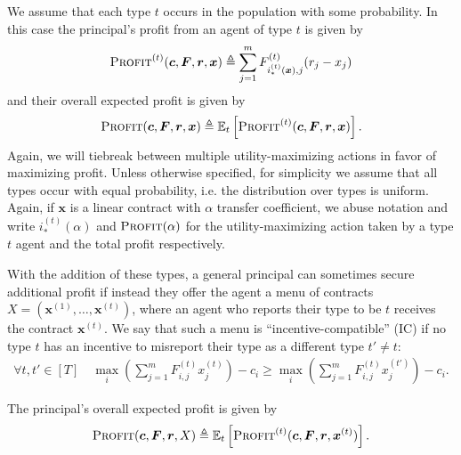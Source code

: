 \documentclass{article}
\newcommand{\E}{\mathbb{E}}
\newcommand{\CostVector}{\bm{c}}
\newcommand{\TypedForecast}[3]{F^{(#1)}_{#2, #3}}
\newcommand{\ForecastTensor}{\bm{F}}
\newcommand{\reward}[1]{r_{#1}}
\newcommand{\RewardVector}{\bm{r}}
\newcommand{\TypedContract}[2]{x^{(#1)}_{#2}}
\newcommand{\ContractVector}{\bm{x}}
\newcommand{\TypedContractVector}[1]{\bm{x}^{(#1)}}
\newcommand{\ContractMatrix}{X}
\newcommand{\TransferCoefficient}{\alpha}
\newcommand{\OptimalAction}{i_*}
\newcommand{\TypedOptimalAction}[1]{\OptimalAction^{(#1)}}
\newcommand{\Profit}{\textsc{Profit}}
\newcommand{\TypedProfit}[1]{\Profit^{(#1)}}
\newcommand{\contract}[1]{x_{#1}}
\begin{document}
We assume that each type $t$ occurs in the population with some probability. In this case the principal's profit from an agent of type $t$ is given by
\begin{align*}
  \TypedProfit{t}(\CostVector, \ForecastTensor, \RewardVector, \ContractVector)
    \triangleq \sum_{j=1}^m \TypedForecast{t}{\TypedOptimalAction{t}(\ContractVector)}{j} (\reward{j} - \contract{j})
\end{align*}
and their overall expected profit is given by 
\begin{align*}
  \Profit(\CostVector, \ForecastTensor, \RewardVector, \ContractVector)
    \triangleq \E_t \left[ \TypedProfit{t}(\CostVector, \ForecastTensor, \RewardVector, \ContractVector) \right] \text{.}
\end{align*}
Again, we will tiebreak between multiple utility-maximizing actions in favor of maximizing profit. Unless otherwise specified, for simplicity  we assume that all types occur with equal probability, i.e. the distribution over types is uniform. Again, if $\ContractVector$ is a linear contract with $\TransferCoefficient$ transfer coefficient, we abuse notation and write $\TypedOptimalAction{t}(\TransferCoefficient)$ and $\Profit(\TransferCoefficient)$ for the utility-maximizing action taken by a type $t$ agent and the total profit respectively.

With the addition of these types, a general principal can sometimes secure additional profit if instead they offer the agent a menu of contracts $\ContractMatrix = \left(\TypedContractVector{1}, \ldots, \TypedContractVector{t}\right)$, where an agent who reports their type to be $t$ receives the contract $\TypedContractVector{t}$. We say that such a menu is ``incentive-compatible'' (IC) if no type $t$ has an incentive to misreport their type as a different type $t' \ne t$:
\begin{align}
  \label{ineq:ic}
  \forall t, t' \in [T] \quad \max_i \left( \sum_{j=1}^m \TypedForecast{t}{i}{j} \TypedContract{t}{j} \right) - c_i
                          \ge \max_i \left( \sum_{j=1}^m \TypedForecast{t}{i}{j} \TypedContract{t'}{j} \right) - c_i
  \text{.}
  \tag{IC}
\end{align}

The principal's overall expected profit is given by
\begin{align*}
  \Profit(\CostVector, \ForecastTensor, \RewardVector, \ContractMatrix)
    \triangleq \E_t \left[ \TypedProfit{t}(\CostVector, \ForecastTensor, \RewardVector, \TypedContractVector{t}) \right] \text{.}
\end{align*}
\end{document}

